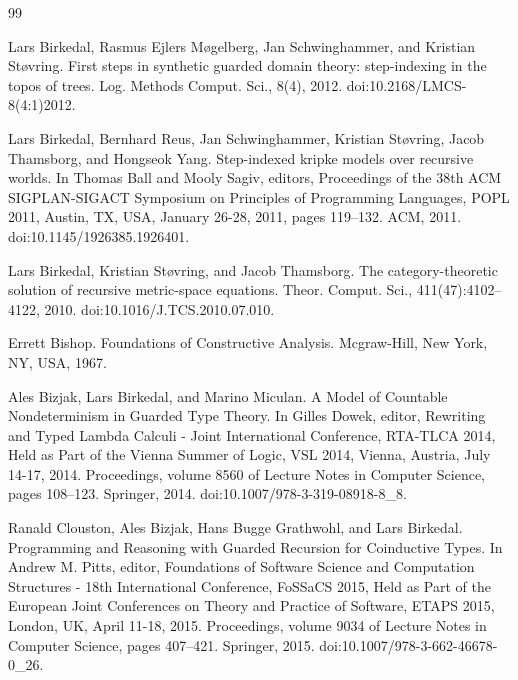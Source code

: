 \documentclass[10pt,a4paper]{article}
\begin{document}
\begin{thebibliography}{99}
\par\noindent    Lars Birkedal, Rasmus Ejlers Møgelberg, Jan Schwinghammer, and Kristian Støvring.  First steps in synthetic guarded domain theory: step-indexing in the topos of trees.  Log. Methods Comput. Sci., 8(4), 2012.  doi:10.2168/LMCS-8(4:1)2012.  

\par\noindent    Lars Birkedal, Bernhard Reus, Jan Schwinghammer, Kristian Støvring, Jacob Thamsborg, and Hongseok Yang.  Step-indexed kripke models over recursive worlds.  In Thomas Ball and Mooly Sagiv, editors, Proceedings of the 38th ACM SIGPLAN-SIGACT Symposium on Principles of Programming Languages, POPL 2011, Austin, TX, USA, January 26-28, 2011, pages 119–132. ACM, 2011.  doi:10.1145/1926385.1926401.  

\par\noindent    Lars Birkedal, Kristian Støvring, and Jacob Thamsborg.  The category-theoretic solution of recursive metric-space equations.  Theor. Comput. Sci., 411(47):4102–4122, 2010.  doi:10.1016/J.TCS.2010.07.010.  

\par\noindent    Errett Bishop.  Foundations of Constructive Analysis.  Mcgraw-Hill, New York, NY, USA, 1967.  

\par\noindent    Ales Bizjak, Lars Birkedal, and Marino Miculan.  A Model of Countable Nondeterminism in Guarded Type Theory.  In Gilles Dowek, editor, Rewriting and Typed Lambda Calculi - Joint International Conference, RTA-TLCA 2014, Held as Part of the Vienna Summer of Logic, VSL 2014, Vienna, Austria, July 14-17, 2014. Proceedings, volume 8560 of Lecture Notes in Computer Science, pages 108–123. Springer, 2014.  doi:10.1007/978-3-319-08918-8\_8.  

\par\noindent    Ranald Clouston, Ales Bizjak, Hans Bugge Grathwohl, and Lars Birkedal.  Programming and Reasoning with Guarded Recursion for Coinductive Types.  In Andrew M. Pitts, editor, Foundations of Software Science and Computation Structures - 18th International Conference, FoSSaCS 2015, Held as Part of the European Joint Conferences on Theory and Practice of Software, ETAPS 2015, London, UK, April 11-18, 2015. Proceedings, volume 9034 of Lecture Notes in Computer Science, pages 407–421. Springer, 2015.  doi:10.1007/978-3-662-46678-0\_26.  


\end{thebibliography}
\end{document}
